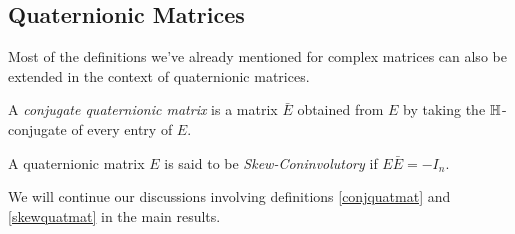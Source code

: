\subsection{Quaternionic Matrices}

Most of the definitions we've already mentioned for complex matrices can also be extended in the context of quaternionic matrices.

\begin{definition} \label{conjquatmat}
	A \emph{conjugate quaternionic matrix} is a matrix $\bar{E}$ obtained from $E$ by taking the $\operatorname{\mathbb{H}}$-conjugate of every entry of $E$.
\end{definition}

\begin{definition} \label{skewquatmat}
	A quaternionic matrix $E$ is said to be \emph{Skew-Coninvolutory} if $E\bar{E} = -I_n$.
\end{definition}

We will continue our discussions involving definitions \ref{conjquatmat} and \ref{skewquatmat} in the main results. 






